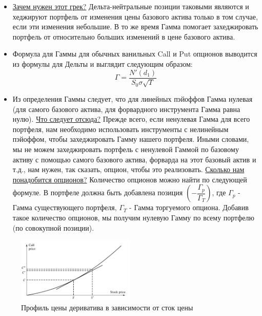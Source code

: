\documentclass{article}
\begin{document}
\begin{itemize}


\item \underline{Зачем нужен этот грек?} Дельта-нейтральные позиции таковыми являются и хеджируют портфель от изменения цены базового актива только в том случае, если эти изменения небольшие. В то же время Гамма помогает захеджировать портфель от относительно больших изменений в цене базового актива.

\item Формула для Гаммы для обычных ванильных Call и Put опционов выводится из формулы для Дельты и выглядит следующим образом:
$$\Gamma = \dfrac{N'(d_1)}{S_0 \sigma \sqrt{T}}$$
\item Из определения Гаммы следует, что для линейных пэйоффов Гамма нулевая (для самого базового актива, для форвардного инструмента Гамма равна нулю). \underline{Что следует отсюда?} Прежде всего, если ненулевая Гамма для всего портфеля, нам необходимо использовать инструменты с нелинейным пэйоффом, чтобы захеджировать Гамму нашего портфеля. Иными словами, мы не можем захеджировать портфель с ненулевой Гаммой по базовому  активу с помощью самого базового актива, форварда  на этот базовый актив и т.д., нам нужен, так сказать, опцион, чтобы это реализовать. \underline{Сколько нам понадобится опционов?} Количество опционов можно найти по следующей формуле. В портфеле должна быть добавлена позиция $\left(-\dfrac{\Gamma_p}{\Gamma_T}\right)$, где $\Gamma_p$ - Гамма существующего портфеля, $\Gamma_T$ - Гамма торгуемого опциона. Добавив такое количество опционов, мы получим нулевую Гамму по всему портфелю (по совокупной позиции). 




\end{itemize}



   \begin{figure}[h]
	\centering
	\includegraphics[width=0.5\textwidth]{option-price-profile.jpg}
	\caption{Профиль цены дериватива в зависимости от сток цены}
	\label{model}
\end{figure}
\end{document}
